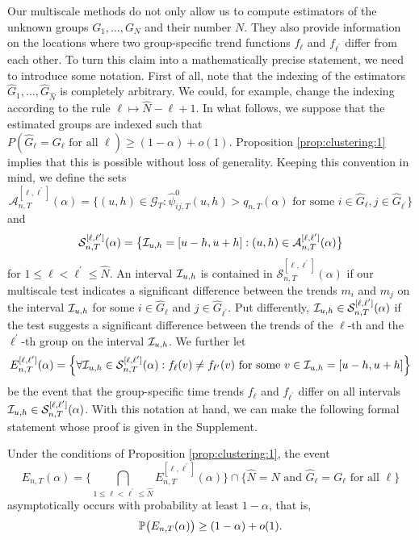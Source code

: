 \documentclass[12pt]{article}
\begin{document}
Our multiscale methods do not only allow us to compute estimators of the unknown groups $G_1,\ldots, G_N$ and their number $N$. They also provide information on the locations where two group-specific trend functions $f_\ell$ and $f_{\ell^\prime}$ differ from each other. To turn this claim into a mathematically precise statement, we need to introduce some notation. First of all, note that the indexing of the estimators $\widehat{G}_1,\ldots,\widehat{G}_{\widehat{N}}$ is completely arbitrary. We could, for example, change the indexing according to the rule $\ell \mapsto \widehat{N} - \ell + 1$. In what follows, we suppose that the estimated groups are indexed such that $P( \widehat{G}_\ell = G_\ell \text{ for all } \ell ) \ge (1-\alpha) + o(1)$. Proposition \ref{prop:clustering:1} implies that this is possible without loss of generality. Keeping this convention in mind, we define the sets 
\[ \mathcal{A}_{n,T}^{[\ell,\ell^\prime]}(\alpha)= \Big\{ (u, h) \in \mathcal{G}_T: \widehat{\psi}^0_{ij, T}(u, h) > q_{n,T}(\alpha) \text{ for some } i \in \widehat{G}_\ell, j \in \widehat{G}_{\ell^\prime} \Big\} \]
and  
\[ \mathcal{S}^{[\ell,\ell^\prime]}_{n, T}(\alpha) = \big\{ \mathcal{I}_{u, h} = [u-h, u+h]: (u, h) \in \mathcal{A}_{n,T}^{[\ell,\ell^\prime]}(\alpha) \big\} \]
for $1 \le \ell < \ell^\prime \le \widehat{N}$. An interval $\mathcal{I}_{u, h}$ is contained in $\mathcal{S}^{[\ell,\ell^\prime]}_{n, T}(\alpha)$ if our multiscale test indicates a significant difference between the trends $m_i$ and $m_j$ on the interval $\mathcal{I}_{u, h}$ for some $i \in \widehat{G}_\ell$ and $j \in \widehat{G}_{\ell^\prime}$. Put differently, $\mathcal{I}_{u, h} \in \mathcal{S}^{[\ell,\ell^\prime]}_{n, T}(\alpha)$ if the test suggests a significant difference between the trends of the $\ell$-th and the $\ell^\prime$-th group on the interval $\mathcal{I}_{u, h}$. We further let
\[ E_{n,T}^{[\ell,\ell^\prime]}(\alpha) = \Big\{ \forall \mathcal{I}_{u, h} \in \mathcal{S}^{[\ell,\ell^\prime]}_{n, T}(\alpha): f_\ell(v) \ne f_{\ell^\prime}(v) \text{ for some } v \in \mathcal{I}_{u, h} = [u-h, u+h] \Big\} \]
be the event that the group-specific time trends $f_\ell$ and $f_{\ell^\prime}$ differ on all intervals $\mathcal{I}_{u, h} \in \mathcal{S}^{[\ell,\ell^\prime]}_{n, T}(\alpha)$. With this notation at hand, we can make the following formal statement whose proof is given in the Supplement.  
\begin{prop}\label{prop:clustering:2}
Under the conditions of Proposition \ref{prop:clustering:1}, the event 
\[ E_{n,T}(\alpha) = \Big\{ \bigcap_{1 \le \ell < \ell^\prime \le \widehat{N}} E_{n,T}^{[\ell,\ell^\prime]}(\alpha) \Big\} \cap \Big\{ \widehat{N} = N \text{ and } \widehat{G}_\ell = G_\ell \text{ for all } \ell \Big\} \]
asymptotically occurs with probability at least $1-\alpha$, that is, 
\[ \mathbb{P} \big( E_{n,T}(\alpha) \big) \ge (1 - \alpha) + o(1). \]
\end{prop}
\end{document}
